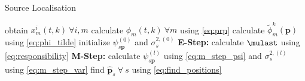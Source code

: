 \begin{algorithm}[h]
\caption{Source Localisation}
\label{alg:localisation}
\begin{algorithmic}
    \State obtain $x^i_m(t,k)\ \forall i,m$
    \State calculate $\phi_m(t,k)~\forall m$ using \eqref{eq:prp}
    \State calculate $\tilde\phi_m^k(\bm p)$ using \eqref{eq:phi_tilde}
    \State initialize $\psi_{s\bm p}^{(0)}$ and $\sigma_s^{2,(0)}$
    \State \textbf{E-Step:} calculate $\mulast$ using \eqref{eq:responsibility}
    \State \textbf{M-Step:} calculate $\psi^{(l)}_{s\bm p}$ using \eqref{eq:m_step_psi} and $\sigma_{s}^{2,(l)}$ using \eqref{eq:m_step_var}
    \EndFor
    \State find $\hat{\bm p}_s\ \forall\ s$ using \eqref{eq:find_positions}
\end{algorithmic}
\end{algorithm}